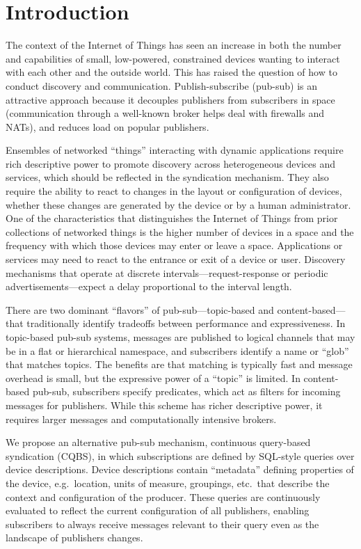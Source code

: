 \section{Introduction}

The context of the Internet of Things has seen an increase in both the number and capabilities of small, low-powered, constrained devices wanting to interact with each other and the outside world.
This has raised the question of how to conduct discovery and communication.
Publish-subscribe (pub-sub) is an attractive approach because it decouples publishers from subscribers in space (communication through a well-known broker helps deal with firewalls and NATs), and reduces load on popular publishers.

Ensembles of networked ``things'' interacting with dynamic applications require rich descriptive power to promote discovery across heterogeneous devices and services, which should be reflected in the syndication mechanism. They also require the ability to react to changes in the layout or configuration of devices, whether these changes are generated by the device or by a human administrator.
One of the characteristics that distinguishes the Internet of Things from prior collections of networked things is the higher number of devices in a space and the frequency with which those devices may enter or leave a space.
Applications or services may need to react to the entrance or exit of a device or user.
Discovery mechanisms that operate at discrete intervals---request-response or periodic advertisements---expect a delay proportional to the interval length.

There are two dominant ``flavors'' of pub-sub---topic-based and content-based---that traditionally identify tradeoffs between performance and expressiveness.
In topic-based pub-sub systems, messages are published to logical channels that may be in a flat or hierarchical namespace, and subscribers identify a name or ``glob'' that matches topics.
The benefits are that matching is typically fast and message overhead is small, but the expressive power of a ``topic'' is limited.
In content-based pub-sub, subscribers specify predicates, which act as filters for incoming messages for publishers.
While this scheme has richer descriptive power, it requires larger messages and computationally intensive brokers.

We propose an alternative pub-sub mechanism, continuous query-based syndication (CQBS), in which subscriptions are defined by SQL-style queries over device descriptions.
Device descriptions contain ``metadata'' defining properties of the device, e.g.\ location, units of measure, groupings, etc.\ that describe the context and configuration of the producer.
These queries are continuously evaluated to reflect the current configuration of all publishers, enabling subscribers to always receive messages relevant to their query even as the landscape of
publishers changes.

